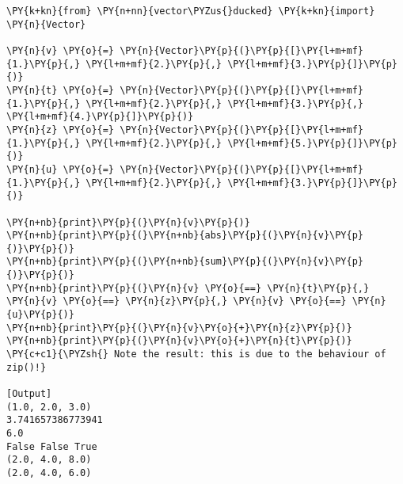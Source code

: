 \begin{Verbatim}[label=\makebox{\url{https://github.com/lucabaldini/cmepda/tree/master/slides/latex/snippets/test\_vector\_ducked.py}},commandchars=\\\{\}]
\PY{k+kn}{from} \PY{n+nn}{vector\PYZus{}ducked} \PY{k+kn}{import} \PY{n}{Vector}
       
\PY{n}{v} \PY{o}{=} \PY{n}{Vector}\PY{p}{(}\PY{p}{[}\PY{l+m+mf}{1.}\PY{p}{,} \PY{l+m+mf}{2.}\PY{p}{,} \PY{l+m+mf}{3.}\PY{p}{]}\PY{p}{)}
\PY{n}{t} \PY{o}{=} \PY{n}{Vector}\PY{p}{(}\PY{p}{[}\PY{l+m+mf}{1.}\PY{p}{,} \PY{l+m+mf}{2.}\PY{p}{,} \PY{l+m+mf}{3.}\PY{p}{,} \PY{l+m+mf}{4.}\PY{p}{]}\PY{p}{)}
\PY{n}{z} \PY{o}{=} \PY{n}{Vector}\PY{p}{(}\PY{p}{[}\PY{l+m+mf}{1.}\PY{p}{,} \PY{l+m+mf}{2.}\PY{p}{,} \PY{l+m+mf}{5.}\PY{p}{]}\PY{p}{)}
\PY{n}{u} \PY{o}{=} \PY{n}{Vector}\PY{p}{(}\PY{p}{[}\PY{l+m+mf}{1.}\PY{p}{,} \PY{l+m+mf}{2.}\PY{p}{,} \PY{l+m+mf}{3.}\PY{p}{]}\PY{p}{)}

\PY{n+nb}{print}\PY{p}{(}\PY{n}{v}\PY{p}{)}
\PY{n+nb}{print}\PY{p}{(}\PY{n+nb}{abs}\PY{p}{(}\PY{n}{v}\PY{p}{)}\PY{p}{)}
\PY{n+nb}{print}\PY{p}{(}\PY{n+nb}{sum}\PY{p}{(}\PY{n}{v}\PY{p}{)}\PY{p}{)}
\PY{n+nb}{print}\PY{p}{(}\PY{n}{v} \PY{o}{==} \PY{n}{t}\PY{p}{,} \PY{n}{v} \PY{o}{==} \PY{n}{z}\PY{p}{,} \PY{n}{v} \PY{o}{==} \PY{n}{u}\PY{p}{)}
\PY{n+nb}{print}\PY{p}{(}\PY{n}{v}\PY{o}{+}\PY{n}{z}\PY{p}{)}
\PY{n+nb}{print}\PY{p}{(}\PY{n}{v}\PY{o}{+}\PY{n}{t}\PY{p}{)} \PY{c+c1}{\PYZsh{} Note the result: this is due to the behaviour of zip()!}

[Output]
(1.0, 2.0, 3.0)
3.741657386773941
6.0
False False True
(2.0, 4.0, 8.0)
(2.0, 4.0, 6.0)
\end{Verbatim}